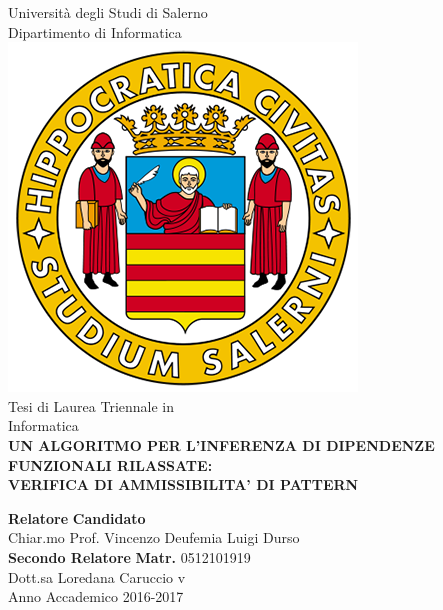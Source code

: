 \begin{center}
	{\Large Università degli Studi di Salerno}\\[0.2truecm]
	{\large Dipartimento di Informatica}\\
	\hrulefill
	\vfill
    \includegraphics[scale = 0.3]{Immagini/logoUnisa.png}\\
    \vspace{1cm}
    {\large Tesi di Laurea Triennale in }\\[0.2truecm]
    {\Large Informatica}\\
    \vfill
    {\large \bf UN ALGORITMO PER L'INFERENZA DI DIPENDENZE FUNZIONALI RILASSATE:}\\
    {\large \bf VERIFICA DI AMMISSIBILITA' DI PATTERN}
    \vfill\vfill\vfill
    
    
    {\bf Relatore} \hfill {\bf Candidato} \\
    Chiar.mo Prof. Vincenzo Deufemia \hfill Luigi Durso \\
    {\bf Secondo Relatore}
    \hfill \textbf{Matr.} 0512101919\\
    
    
    Dott.sa Loredana Caruccio  \hfill {\phantom v} \\
    \vspace{1cm}
    \hrulefill 
    \vfill
    Anno Accademico 2016-2017
\end{center}
